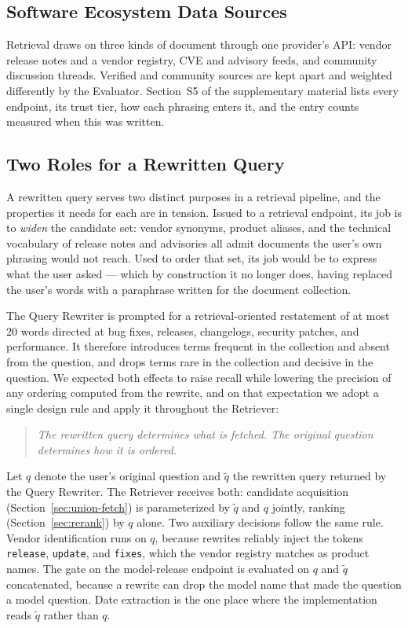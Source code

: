 \documentclass[acmsmall,review,anonymous,screen]{acmart}
\begin{document}
\subsection{Software Ecosystem Data Sources}\label{sec:datasources}

Retrieval draws on three kinds of document through one provider's API:
vendor release notes and a vendor registry, CVE and advisory feeds, and
community discussion threads. Verified and community sources are kept apart
and weighted differently by the Evaluator. Section~S5 of the supplementary
material lists every endpoint, its trust tier, how each phrasing enters it,
and the entry counts measured when this was written.

\subsection{Two Roles for a Rewritten Query}\label{sec:rewrite-roles}

A rewritten query serves two distinct purposes in a retrieval pipeline,
and the properties it needs for each are in tension. Issued to a
retrieval endpoint, its job is to \emph{widen} the candidate set:
vendor synonyms, product aliases, and the technical vocabulary of
release notes and advisories all admit documents the user's own
phrasing would not reach. Used to order that set, its job would be to
express what the user asked --- which by construction it no longer
does, having replaced the user's words with a paraphrase written for
the document collection.

The Query Rewriter is prompted for a retrieval-oriented restatement of
at most 20 words directed at bug fixes, releases, changelogs, security
patches, and performance. It therefore introduces terms frequent in the
collection and absent from the question, and drops terms rare in the
collection and decisive in the question. We expected both effects to raise
recall while lowering the precision of any ordering computed from the rewrite,
and on that expectation we adopt a single design rule and apply it throughout
the Retriever:

\begin{quote}
\emph{The rewritten query determines what is fetched. The original
question determines how it is ordered.}
\end{quote}

Let $q$ denote the user's original question and $\tilde{q}$ the
rewritten query returned by the Query Rewriter. The Retriever receives
both: candidate acquisition (Section~\ref{sec:union-fetch}) is
parameterized by $\tilde{q}$ and $q$ jointly, ranking
(Section~\ref{sec:rerank}) by $q$ alone. Two auxiliary decisions follow
the same rule. Vendor identification runs on $q$, because rewrites
reliably inject the tokens \texttt{release}, \texttt{update}, and
\texttt{fixes}, which the vendor registry matches as product names. The
gate on the model-release endpoint is evaluated on $q$ and $\tilde{q}$
concatenated, because a rewrite can drop the model name that made the
question a model question. Date extraction is the one place where the
implementation reads $\tilde{q}$ rather than $q$.
\end{document}
